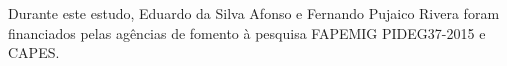 Durante este estudo, Eduardo da Silva Afonso e Fernando Pujaico Rivera foram financiados pelas 
agências de fomento à pesquisa FAPEMIG PIDEG37-2015 e CAPES.